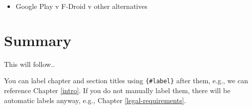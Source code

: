\documentclass[
]{book}
\providecommand{\tightlist}{%
  \setlength{\itemsep}{0pt}\setlength{\parskip}{0pt}}
\begin{document}
\begin{itemize}
\tightlist
\item
  Google Play v F-Droid v other alternatives
\end{itemize}

\hypertarget{summary}{%
\chapter{Summary}\label{summary}}

This will follow..

You can label chapter and section titles using \texttt{\{\#label\}} after them, e.g., we can reference Chapter \ref{intro}. If you do not manually label them, there will be automatic labels anyway, e.g., Chapter \ref{legal-requirements}.

  
\end{document}
